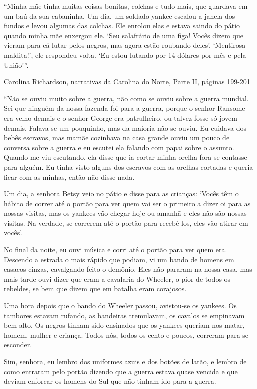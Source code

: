 ``Minha mãe tinha muitas coisas bonitas, colchas e tudo mais, que
guardava em um baú da sua cabaninha. Um dia, um soldado yankee escalou a
janela dos fundos e levou algumas das colchas. Ele enrolou elas e estava
saindo do pátio quando minha mãe enxergou ele. `Seu salafrário de uma
figa! Vocês dizem que vieram para cá lutar pelos negros, mas agora estão
roubando deles'. `Mentirosa maldita!', ele respondeu volta. `Eu estou
lutando por 14 dólares por mês e pela União'''.

Carolina Richardson, narrativas da Carolina do Norte, Parte II, páginas
199-201

``Não se ouviu muito sobre a guerra, não como se ouviu sobre a guerra
mundial. Sei que ninguém da nossa fazenda foi para a guerra, porque o
senhor Ransome era velho demais e o senhor George era patrulheiro, ou
talvez fosse só jovem demais. Falava-se um pouquinho, mas da maioria não
se ouviu. Eu cuidava dos bebês escravos, mas mamãe cozinhava na casa
grande ouviu um pouco de conversa sobre a guerra e eu escutei ela
falando com papai sobre o assunto. Quando me viu escutando, ela disse
que ia cortar minha orelha fora se contasse para alguém. Eu tinha visto
alguns dos escravos com as orelhas cortadas e queria ficar com as
minhas, então não disse nada.

Um dia, a senhora Betsy veio no pátio e disse para as crianças: `Vocês
têm o hábito de correr até o portão para ver quem vai ser o primeiro a
dizer oi para as nossas visitas, mas os yankees vão chegar hoje ou
amanhã e eles não são nossas visitas. Na verdade, se correrem até o
portão para recebê-los, eles vão atirar em vocês'.

No final da noite, eu ouvi música e corri até o portão para ver quem
era. Descendo a estrada o mais rápido que podiam, vi um bando de homens
em casacos cinzas, cavalgando feito o demônio. Eles não pararam na nossa
casa, mas mais tarde ouvi dizer que eram a cavalaria do Wheeler, o pior
de todos os rebeldes, se bem que dizem que em batalha eram corajosos.

Uma hora depois que o bando do Wheeler passou, avistou-se os yankees. Os
tambores estavam rufando, as bandeiras tremulavam, os cavalos se
empinavam bem alto. Os negros tinham sido ensinados que os yankees
queriam nos matar, homem, mulher e criança. Todos nós, todos os cento e
poucos, correram para se esconder.

Sim, senhora, eu lembro dos uniformes azuis e dos botões de latão, e
lembro de como entraram pelo portão dizendo que a guerra estava quase
vencida e que deviam enforcar os homens do Sul que não tinham ido para a
guerra.

